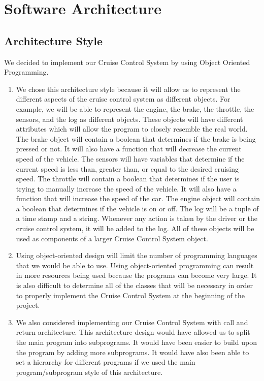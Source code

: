 \documentclass[preprint,11pt,3p]{article}
\begin{document}
\newpage
\section{Software Architecture}

\subsection{Architecture Style} 
We decided to implement our Cruise Control System by using Object Oriented Programming.
\begin{enumerate} 
	\item We chose this architecture style because it will allow us to represent the different aspects of the cruise control system as different objects. For example, we will be able to represent the engine, the brake, the throttle, the sensors, and the log as different objects. These objects will have different attributes which will allow the program to closely resemble the real world. The brake object will contain a boolean that determines if the brake is being pressed or not. It will also have a function that will decrease the current speed of the vehicle. The sensors will have variables that determine if the current speed is less than, greater than, or equal to the desired cruising speed. The throttle will contain a boolean that determines if the user is trying to manually increase the speed of the vehicle. It will also have a function that will increase the speed of the car. The engine object will contain a boolean that determines if the vehicle is on or off. The log will be a tuple of a time stamp and a string. Whenever any action is taken by the driver or the cruise control system, it will be added to the log. All of these objects will be used as components of a larger Cruise Control System object.
	\item Using object-oriented design will limit the number of programming languages that we would be able to use. Using object-oriented programming can result in more resources being used because the programs can become very large. It is also difficult to determine all of the classes that will be necessary in order to properly implement the Cruise Control System at the beginning of the project.
	\item We also considered implementing our Cruise Control System with call and return architecture. This architecture design would have allowed us to split the main program into subprograms. It would have been easier to build upon the program by adding more subprograms. It would have also been able to set a hierarchy for different programs if we used the main program/subprogram style of this architecture.

\end{enumerate}
\end{document}
